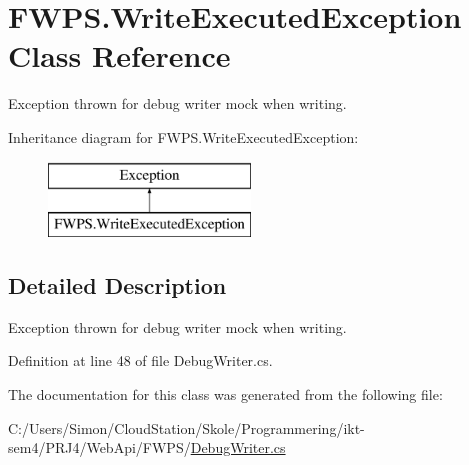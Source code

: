 \hypertarget{class_f_w_p_s_1_1_write_executed_exception}{}\section{F\+W\+P\+S.\+Write\+Executed\+Exception Class Reference}
\label{class_f_w_p_s_1_1_write_executed_exception}


Exception thrown for debug writer mock when writing.  


Inheritance diagram for F\+W\+P\+S.\+Write\+Executed\+Exception\+:\begin{figure}[H]
\begin{center}
\leavevmode
\includegraphics[height=2.000000cm]{class_f_w_p_s_1_1_write_executed_exception}
\end{center}
\end{figure}


\subsection{Detailed Description}
Exception thrown for debug writer mock when writing. 

Definition at line 48 of file Debug\+Writer.\+cs.



The documentation for this class was generated from the following file\+:\begin{DoxyCompactItemize}
\item 
C\+:/\+Users/\+Simon/\+Cloud\+Station/\+Skole/\+Programmering/ikt-\/sem4/\+P\+R\+J4/\+Web\+Api/\+F\+W\+P\+S/\mbox{\hyperlink{_debug_writer_8cs}{Debug\+Writer.\+cs}}\end{DoxyCompactItemize}
